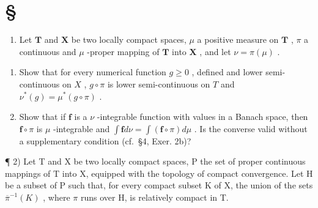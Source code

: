 \section*{\texorpdfstring{\S\CurrentExerciseGroup}{Section \CurrentExerciseGroup}}
{}

\begin{enumerate}
\def\labelenumi{\arabic{enumi})}
\tightlist
\item
  Let \(\mathbf{T}\) and \(\mathbf{X}\) be two locally compact spaces, \(\mu\) a positive measure on \(\mathbf{T}\) , \(\pi\) a continuous and \(\mu\) -proper mapping of \(\mathbf{T}\) into \(\mathbf{X}\) , and let \(\nu = \pi(\mu)\) .
\end{enumerate}

\begin{enumerate}
\def\labelenumi{\alph{enumi})}
\item
  Show that for every numerical function \(g \geqslant 0\) , defined and lower semi-continuous on \(X\) , \(g \circ \pi\) is lower semi-continuous on \(T\) and \(\nu^{*}(g) = \mu^{*}(g \circ \pi)\) .
\item
  Show that if \(\mathbf{f}\) is a \(\nu\) -integrable function with values in a Banach space, then \(\mathbf{f} \circ \pi\) is \(\mu\) -integrable and \(\int \mathbf{f} d\nu = \int (\mathbf{f} \circ \pi) d\mu\) . Is the converse valid without a supplementary condition (cf.~§4, Exer. 2b)?
\end{enumerate}

¶ 2) Let T and X be two locally compact spaces, P the set of proper continuous mappings of T into X, equipped with the topology of compact convergence. Let H be a subset of P such that, for every compact subset K of X, the union of the sets \(\overline{\pi}^{-1}(K)\) , where \(\pi\) runs over H, is relatively compact in T.

